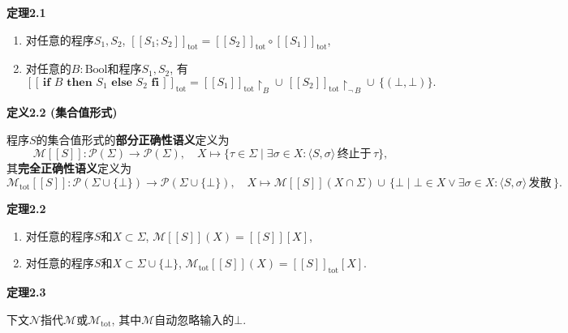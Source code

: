 \documentclass[UTF8]{ctexart}
\begin{document}
\hypertarget{sec:定理2.1}{}
\noindent\textbf{定理2.1}

\begin{enumerate}
    \item 对任意的程序$S_1,S_2$, $[\![S_1;S_2]\!]_{\mathrm{tot}}=
    [\![S_2]\!]_{\mathrm{tot}}\circ[\![S_1]\!]_{\mathrm{tot}}$,
    \item 对任意的$B:\mathrm{Bool}$和程序$S_1,S_2$, 有
    \[
        [\![\,\mathbf{if}\,\,B\,\,\mathbf{then}\,\,S_1\,\,\mathbf{else}\,\,S_2
        \,\,\mathbf{fi}\,]\!]_{\mathrm{tot}}=
        [\![S_1]\!]_{\mathrm{tot}}\!\restriction_B\cup\,
        [\![S_2]\!]_{\mathrm{tot}}\!\restriction_{\neg\,B}\cup\,\{(\bot,\bot)\}.
    \]
\end{enumerate}

\vspace{10pt}

\hypertarget{sec:定义2.2}{}
\noindent\textbf{定义2.2 (集合值形式)}

程序$S$的集合值形式的\textbf{部分正确性语义}定义为
\[
    \mathcal{M}[\![S]\!]:\mathcal{P}(\Sigma)\to\mathcal{P}(\Sigma),\quad
    X\mapsto\{\tau\in\Sigma\mid\exists\sigma\in X:\langle S,\sigma\rangle
    \,\text{终止于}\,\tau\},
\]
其\textbf{完全正确性语义}定义为
\[
    \mathcal{M}_{\mathrm{tot}}[\![S]\!]:\mathcal{P}(\Sigma\cup\{\bot\})\to
    \mathcal{P}(\Sigma\cup\{\bot\}),\quad
    X\mapsto\mathcal{M}[\![S]\!](X\cap\Sigma)\cup\,\{\bot\mid\bot\in X\lor
    \exists\sigma\in X:\langle S,\sigma\rangle\,\text{发散}\,\}.
\]

\vspace{10pt}

\hypertarget{sec:定理2.2}{}
\noindent\textbf{定理2.2}

\begin{enumerate}
    \item 对任意的程序$S$和$X\subset\Sigma$,
    $\mathcal{M}[\![S]\!](X)=[\![S]\!][X]$,
    \item 对任意的程序$S$和$X\subset\Sigma\cup\{\bot\}$,
    $\mathcal{M}_{\mathrm{tot}}[\![S]\!](X)=[\![S]\!]_{\mathrm{tot}}[X]$.
\end{enumerate}

\vspace{10pt}

\hypertarget{sec:定理2.3}{}
\noindent\textbf{定理2.3}

下文$\mathcal{N}$指代$\mathcal{M}$或$\mathcal{M}_{\mathrm{tot}}$,
其中$\mathcal{M}$自动忽略输入的$\bot$.
\end{document}
